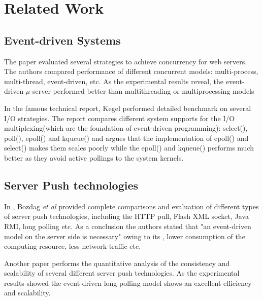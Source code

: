\section{Related Work\\}

\subsection{Event-driven Systems\\}

The paper\cite{David} evaluated several strategies to achieve concurrency
for web servers. The authors compared performance of different concurrent models:
multi-process, multi-thread, event-driven, etc.  As the experimental 
results reveal, the event-driven $\mu$-server performed better than 
multithreading or multiprocessing models
    
In the famous technical report\cite{C10K}, Kegel performed detailed
benchmark on several I/O strategies. The report compares different 
system supports for the I/O multiplexing(which are the foundation
of event-driven programming): select(), poll(), epoll() and kqueue() 
and argues that the implementation of epoll() and select() makes them
scales poorly while the epoll() and kqueue() performs much better as
they avoid active pollings to the system kernels.

\subsection{Server Push technologies\\}

In \cite{Engin}, Bozdag \emph{et al} provided complete comparisons 
and evaluation of different types of server push technologies, including the 
HTTP pull, Flash XML socket, Java RMI, long polling etc. As a conclusion the
authors stated that "an event-driven model on the server side is necessary" 
owing to its , lower consumption of the computing resource, less network
traffic etc.

Another paper \cite{duquennoy09consistency} performs the quantitative 
analysis of the consistency and scalability of several different server
push technologies. As the experimental results showed the event-driven
long polling model shows an excellent efficiency and scalability.

